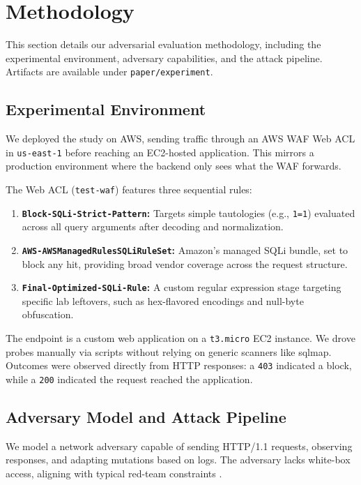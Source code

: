 \section{Methodology}
\label{sec:methodology}
This section details our adversarial evaluation methodology, including the experimental environment, adversary capabilities, and the attack pipeline. Artifacts are available under \texttt{paper/experiment}.

\subsection{Experimental Environment}
We deployed the study on AWS, sending traffic through an AWS WAF Web ACL in \texttt{us-east-1} before reaching an EC2-hosted application. This mirrors a production environment where the backend only sees what the WAF forwards. 

The Web ACL (\texttt{test-waf}) features three sequential rules:
\begin{enumerate}
  \item \textbf{\texttt{Block-SQLi-Strict-Pattern}:} Targets simple tautologies (e.g., \texttt{1=1}) evaluated across all query arguments after decoding and normalization.
  \item \textbf{\texttt{AWS-AWSManagedRulesSQLiRuleSet}:} Amazon's managed SQLi bundle, set to block any hit, providing broad vendor coverage across the request structure.
  \item \textbf{\texttt{Final-Optimized-SQLi-Rule}:} A custom regular expression stage targeting specific lab leftovers, such as hex-flavored encodings and null-byte obfuscation.
\end{enumerate}

The endpoint is a custom web application on a \texttt{t3.micro} EC2 instance. We drove probes manually via scripts without relying on generic scanners like sqlmap. Outcomes were observed directly from HTTP responses: a \texttt{403} indicated a block, while a \texttt{200} indicated the request reached the application.

\subsection{Adversary Model and Attack Pipeline}
We model a network adversary capable of sending HTTP/1.1 requests, observing responses, and adapting mutations based on logs. The adversary lacks white-box access, aligning with typical red-team constraints \cite{guan2023ssqli,demetrio2020wafamole}. 

